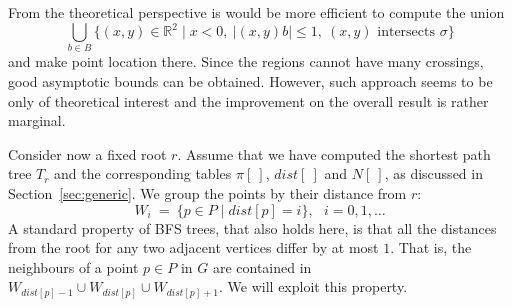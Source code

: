 \documentclass[a4paper,11pt]{article}
\newcommand{\RR}{\ensuremath{\mathbb R}}  %
\def\dist{\mathit{dist}}
\let\le\leqslant
\begin{document}
From the theoretical perspective is would be more efficient to compute the union
\[
	\bigcup_{b\in B} \{ (x,y)\in \RR^2\mid x<0,~ |(x,y)b|\le 1,~ (x,y) 
			\text{ intersects } \sigma \}
\]
and make point location there. Since the regions cannot have many crossings,
good asymptotic bounds can be obtained. However, such approach seems to be 
only of theoretical interest and the improvement on the overall result
is rather marginal.

Consider now a fixed root $r$. Assume that we have computed 
the shortest path tree $T_r$ and the corresponding tables $\pi[~]$, $\dist[~]$ and $N[~]$,
as discussed in Section~\ref{sec:generic}.
We group the points by their distance from $r$:
\[
	W_i ~=~ \{ p\in P \mid \dist[p]=i \},~~~ i=0,1,\dots
\]
A standard property of BFS trees, that also holds here,
is that all the distances from the root for any two adjacent vertices differ by at most $1$.
That is, the neighbours of a point $p\in P$ in $G$ are contained in
$W_{\dist[p]-1}\cup W_{\dist[p]} \cup W_{\dist[p]+1}$.
We will exploit this property.
\end{document}
